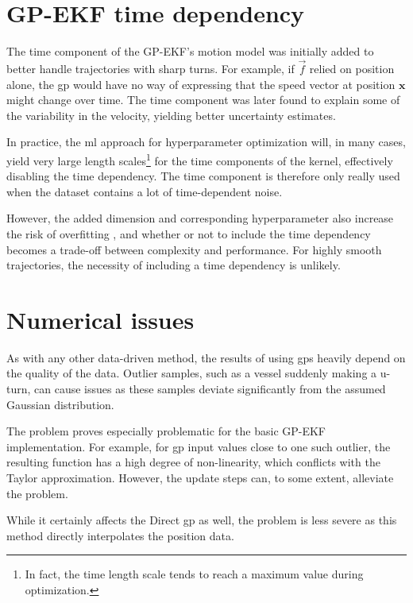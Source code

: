 \section{GP-EKF time dependency}
The time component of the GP-EKF's motion model was initially added to better handle trajectories with sharp turns. For example, if $\vec{f}$ relied on position alone, the \acrshort{gp} would have no way of expressing that the speed vector at position $\boldsymbol{x}$ might change over time. The time component was later found to explain some of the variability in the velocity, yielding better uncertainty estimates.

In practice, the \acrshort{ml} approach for hyperparameter optimization will, in many cases, yield very large length scales\footnote{In fact, the time length scale tends to reach a maximum value during optimization.} for the time components of the kernel, effectively disabling the time dependency. The time component is therefore only really used when the dataset contains a lot of time-dependent noise.

However, the added dimension and corresponding hyperparameter also increase the risk of overfitting \cite{rasmussen}, and whether or not to include the time dependency becomes a trade-off between complexity and performance. For highly smooth trajectories, the necessity of including a time dependency is unlikely. 

\section{Numerical issues}
As with any other data-driven method, the results of using \acrshort{gp}s heavily depend on the quality of the data. Outlier samples, such as a vessel suddenly making a u-turn, can cause issues as these samples deviate significantly from the assumed Gaussian distribution.

The problem proves especially problematic for the basic GP-EKF implementation. For example, for \acrshort{gp} input values close to one such outlier, the resulting function has a high degree of non-linearity, which conflicts with the Taylor approximation. However, the update steps can, to some extent, alleviate the problem. 

While it certainly affects the Direct \acrshort{gp} as well, the problem is less severe as this method directly interpolates the position data.  

